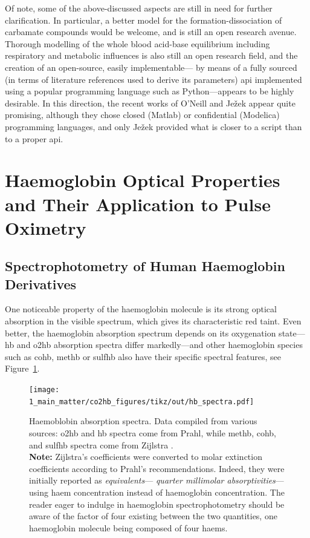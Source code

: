 \mfrin{}Of note, some of the above-discussed aspects are still in need for further clarification. In particular, a better model for the formation-dissociation of carbamate compounds would be welcome, and is still an open research avenue\cite{blake2022}. Thorough modelling of the whole blood acid-base equilibrium including respiratory and metabolic influences is also still an open research field, and the creation of an open-source, easily implementable---\ie{} by means of a fully sourced (in terms of literature references used to derive its parameters) \gls{api} implemented using a popular programming language such as Python---appears to be highly desirable. In this direction, the recent works of O'Neill and Ježek appear quite promising\cite{oneill2017, jezek2018}, although they chose closed (Matlab) or confidential (Modelica) programming languages, and only Ježek provided what is closer to a script than to a proper \gls{api}.

\section[Hb. Optical Prop. and Their App. to Pulse Oximetry]{Haemoglobin Optical Properties and Their Application to Pulse Oximetry}

\subsection{Spectrophotometry of Human Haemoglobin Derivatives}\label{sect:co2hb:hb_optical_prop}

One noticeable property of the haemoglobin molecule is its strong optical absorption in the visible spectrum, which gives \myblood{} its characteristic red taint. Even better, the haemoglobin absorption spectrum depends on its oxygenation state---\ie{} \gls{hb} and \gls{o2hb} absorption spectra differ markedly---and other haemoglobin species such as \gls{cohb}, \gls{methb} or \gls{sulfhb} also have their specific spectral features, see Figure~\ref{fig:co2hb:hb_spectra}.

\begin{figure}
	\centering
	\texttt{[image: 1\_main\_matter/co2hb\_figures/tikz/out/hb\_spectra.pdf]}
	\caption[Absorption spectra of haemoglobin derivatives from the literature.]{Haemoblobin absorption spectra. Data compiled from various sources: \gls{o2hb} and \gls{hb} spectra come from Prahl\cite{prahl1998}, while \gls{methb}, \gls{cohb}, and \gls{sulfhb} spectra come from Zijlstra \etal{}\cite{zijlstra2000}.\\\textbf{Note:} Zijlstra's coefficients were converted to molar extinction coefficients according to Prahl's recommendations. Indeed, they were initially reported as \emph{equivalents}---\aka{} \emph{quarter millimolar absorptivities}---\ie{} using haem concentration instead of haemoglobin concentration. The reader eager to indulge in haemoglobin spectrophotometry should be aware of the factor of four existing between the two quantities, one haemoglobin molecule being composed of four haems.}
	\label{fig:co2hb:hb_spectra}
\end{figure}

